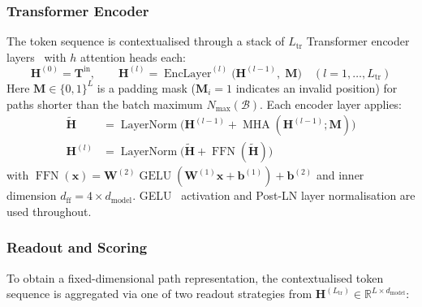 \documentclass[runningheads]{llncs}
\begin{document}
\subsubsection{Transformer Encoder}

\label{sec:transformer-encoder}
The token sequence is contextualised through a stack of $L_{\text{tr}}$
Transformer encoder layers~\cite{vaswani2017attention} with $h$ attention heads each:
\begin{equation}
  \mathbf{H}^{(0)} = \mathbf{T}^{\text{in}},\qquad
  \mathbf{H}^{(l)} = \operatorname{EncLayer}^{(l)}\bigl(\mathbf{H}^{(l-1)},\; \mathbf{M}\bigr)
  \quad (l = 1, \ldots, L_{\text{tr}})
  \label{eq:transformer}
\end{equation}
Here $\mathbf{M} \in \{0, 1\}^{L}$ is a padding mask ($\mathbf{M}_i = 1$ indicates an
invalid position) for paths shorter than the batch maximum $N_{\max}(\mathcal{B})$.
Each encoder layer applies:
\begin{align}
  \tilde{\mathbf{H}} &= \operatorname{LayerNorm}\bigl(
  \mathbf{H}^{(l-1)} + \operatorname{MHA}(\mathbf{H}^{(l-1)}; \mathbf{M})\bigr)
  \label{eq:attn}\\
  \mathbf{H}^{(l)} &= \operatorname{LayerNorm}\bigl(
  \tilde{\mathbf{H}} + \operatorname{FFN}(\tilde{\mathbf{H}})\bigr)
  \label{eq:ffn}
\end{align}
with $\operatorname{FFN}(\mathbf{x}) = \mathbf{W}^{(2)} \operatorname{GELU}(\mathbf{W}^{(1)} \mathbf{x} + \mathbf{b}^{(1)}) + \mathbf{b}^{(2)}$
and inner dimension $d_{\text{ff}} = 4 \times d_{\text{model}}$.
GELU~\cite{hendrycks2016gaussian} activation
and Post-LN layer normalisation are used throughout.

\subsubsection{Readout and Scoring}

\label{sec:readout}

To obtain a fixed-dimensional path representation, the contextualised token
sequence is aggregated via one of two readout strategies from
$\mathbf{H}^{(L_{\text{tr}})} \in \mathbb{R}^{L \times d_{\text{model}}}$:
\end{document}
